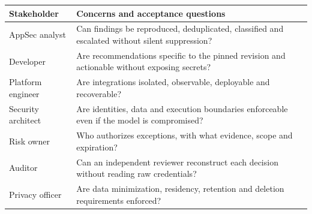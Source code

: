 \documentclass[11pt,letterpaper]{article}
\begin{document}
\begin{longtable}{@{}>{\raggedright\arraybackslash}p{.24\linewidth}>{\raggedright\arraybackslash}p{.68\linewidth}@{}}
\toprule Stakeholder & Concerns and acceptance questions\\\midrule\endhead
AppSec analyst & Can findings be reproduced, deduplicated, classified and escalated without silent suppression?\\
Developer & Are recommendations specific to the pinned revision and actionable without exposing secrets?\\
Platform engineer & Are integrations isolated, observable, deployable and recoverable?\\
Security architect & Are identities, data and execution boundaries enforceable even if the model is compromised?\\
Risk owner & Who authorizes exceptions, with what evidence, scope and expiration?\\
Auditor & Can an independent reviewer reconstruct each decision without reading raw credentials?\\
Privacy officer & Are data minimization, residency, retention and deletion requirements enforced?\\
\bottomrule
\end{longtable}
\end{document}
